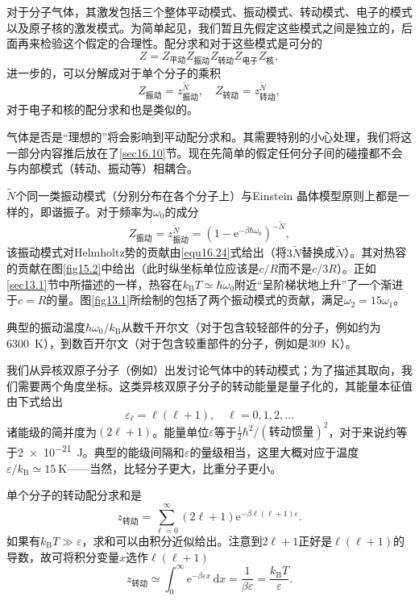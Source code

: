 对于分子气体，其激发包括三个整体平动模式、振动模式、转动模式、电子的模式以及原子核的激发模式。为简单起见，我们暂且先假定这些模式之间是独立的，后面再来检验这个假定的合理性。配分求和对于这些模式是可分的
\begin{equation}
Z = Z_\text{平动}Z_\text{振动}Z_\text{转动}Z_{电子}Z_{核},
\end{equation}
进一步的，可以分解成对于单个分子的乘积
\begin{equation}
Z_\text{振动}=z_\text{振动}^{\tilde N},\quad Z_\text{转动}=z_\text{转动}^{\tilde N},
\end{equation}
对于电子和核的配分求和也是类似的。

气体是否是“理想的”将会影响到平动配分求和。其需要特别的小心处理，我们将这一部分内容推后放在了\ref{sec16.10}节。现在先简单的假定任何分子间的碰撞都不会与内部模式（转动、振动等）相耦合。

$\tilde N$个同一类振动模式（分别分布在各个分子上）与Einstein 晶体模型原则上都是一样的，即谐振子。对于频率为$\omega_0$的成分
\begin{equation}
Z_\text{振动}=z_\text{振动}^{\tilde N}=(1-\mathrm e^{-\beta\hbar\omega_0})^{-\tilde N},
\end{equation}
该振动模式对Helmholtz势的贡献由\eqref{equ16.24}式给出（将$3\tilde N$替换成$\tilde N$）。其对热容的贡献在图\ref{fig15.2}中给出（此时纵坐标单位应该是$c/R$而不是$c/3R$）。正如\ref{sec13.1}节中所描述的一样，热容在$k_\text{B}T\simeq \hbar\omega_0$附近“呈阶梯状地上升”了一个渐进于$c=R$的量。图\ref{fig13.1}所绘制的包括了两个振动模式的贡献，满足$\omega_2=15\omega_1$。

典型的振动温度$\hbar\omega_0/k_\text{B}$从数千开尔文（对于包含较轻部件的分子，例如约为\SI{6300}{\kelvin}），到数百开尔文（对于包含较重部件的分子，例如是\SI{309}{\kelvin}）。

我们从异核双原子分子（例如）出发讨论气体中的转动模式；为了描述其取向，我们需要两个角度坐标。这类异核双原子分子的转动能量是量子化的，其能量本征值由下式给出
\begin{equation}
\varepsilon_\ell = \ell(\ell+1),\quad \ell =0,1,2,\dots
\label{equ16.28}
\end{equation}
诸能级的简并度为$(2\ell+1)$。能量单位$\varepsilon$等于$\frac{1}{2}\hbar^2/(\text{转动惯量})^2$，对于来说约等于\SI{2e-21}{\joule}。典型的能级间隔和$\varepsilon$的量级相当，这里大概对应于温度$\varepsilon/k_\text{B}\simeq \SI{15}{\kelvin}$——当然，比轻分子更大，比重分子更小。

单个分子的转动配分求和是
\begin{equation}
z_\text{转动}=\sum\limits_{\ell=0}^{\infty}(2\ell+1)\mathrm e^{-\beta\ell(\ell+1)\varepsilon}.
\label{equ16.29}
\end{equation}
如果有$k_\text{B}T\gg\varepsilon$，求和可以由积分近似给出。注意到$2\ell+1$正好是$\ell(\ell+1)$的导数，故可将积分变量$x$选作$\ell(\ell+1)$
\begin{equation}
z_\text{转动}\simeq\int_{0}^{\infty}\mathrm e^{-\beta\varepsilon x}\,\mathrm dx =\frac{1}{\beta\varepsilon}=\frac{k_\text{B}T}{\varepsilon}.
\end{equation}

